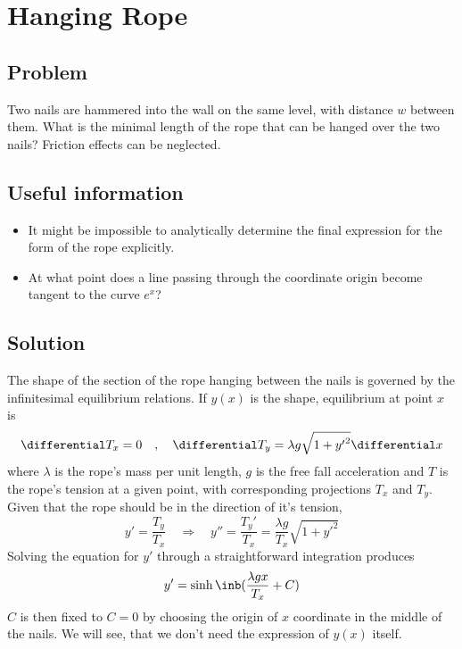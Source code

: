 \section*{Hanging Rope}

\subsection*{Problem}

Two nails are hammered into the wall on the same level,
with distance $w$ between them. What is the minimal length of the rope
that can be hanged over the two nails?
Friction effects can be neglected.

\subsection*{Useful information}
\begin{itemize}
    \item It might be impossible to analytically determine
    the final expression for the form of the rope explicitly.

    \item At what point does a line passing through the coordinate origin
    become tangent to the curve $e^x$?
\end{itemize}

\subsection*{Solution}

The shape of the section of the rope hanging between the nails
is governed by the infinitesimal equilibrium relations.
If $y(x)$ is the shape, equilibrium at point $x$ is
\begin{equation}
    \differential T_x = 0 \quad,\quad
    \differential T_y = \lambda g \sqrt{1+{y'}^2} \differential x
\end{equation}
where $\lambda$ is the rope's mass per unit length,
$g$ is the free fall acceleration and
$T$ is the rope's tension at a given point,
with corresponding projections $T_x$ and $T_y$.
Given that the rope should be in the direction of it's tension,
\begin{equation}
    y' = \frac{T_y}{T_x} \quad \Rightarrow \quad y''=\frac{T_y'}{T_x}=
    \frac{\lambda g}{T_x}\sqrt{1+{y'}^2}
\end{equation}
Solving the equation for $y'$ through a straightforward integration produces
\begin{equation}
    y' = \sinh\inb({\frac{\lambda g x}{T_x} + C})
\end{equation}
$C$ is then fixed to $C=0$
by choosing the origin of $x$ coordinate in the middle of the nails.
We will see, that we don't need the expression of $y(x)$ itself.

